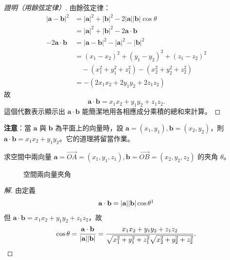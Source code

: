 \begin{proof}[證明（用餘弦定律）]
由餘弦定律：
\begin{align*}
|\mathbf{a} - \mathbf{b}|^2 &= |\mathbf{a}|^2 + |\mathbf{b}|^2 - 2|\mathbf{a}||\mathbf{b}|\cos\theta \\
&= |\mathbf{a}|^2 + |\mathbf{b}|^2 - 2\mathbf{a}\cdot\mathbf{b} \\
-2\mathbf{a}\cdot\mathbf{b} &= |\mathbf{a} - \mathbf{b}|^2 - |\mathbf{a}|^2 - |\mathbf{b}|^2 \\
&= (x_1 - x_2)^2 + (y_1 - y_2)^2 + (z_1 - z_2)^2 \\
&\quad - (x_1^2 + y_1^2 + z_1^2) - (x_2^2 + y_2^2 + z_2^2) \\
&= -(2x_1 x_2 + 2y_1 y_2 + 2z_1 z_2)
\end{align*}
故
\[ \mathbf{a}\cdot\mathbf{b} = x_1 x_2 + y_1 y_2 + z_1 z_2. \]
這個代數表示顯示出 $\mathbf{a}\cdot\mathbf{b}$ 能簡潔地用各相應成分乘積的總和來計算。\qedhere
\end{proof}

\textbf{注意}：當 $\mathbf{a}$ 與 $\mathbf{b}$ 為平面上的向量時，設 $\mathbf{a} = (x_1, y_1), \mathbf{b} = (x_2, y_2)$，則 $\mathbf{a}\cdot\mathbf{b} = x_1 x_2 + y_1 y_2$。它的道理將留當作業。

\begin{example}[論例 9]
求空間中兩向量 $\mathbf{a} = \vec{OA} = (x_1, y_1, z_1), \mathbf{b} = \vec{OB} = (x_2, y_2, z_2)$ 的夾角 $\theta$。
\end{example}

\begin{figure}[H]
\centering
{}
\caption{空間兩向量夾角}
\label{fig:b3-fig3-39}
\end{figure}

\begin{proof}[解]
\label{note:b3-ch3-p113-cos-theta-typo}%
由定義
\[ \mathbf{a}\cdot\mathbf{b} = |\mathbf{a}||\mathbf{b}|\cos\theta\footnotemark \]
但 $\mathbf{a}\cdot\mathbf{b} = x_1 x_2 + y_1 y_2 + z_1 z_2$，故
\[ \cos\theta = \frac{\mathbf{a}\cdot\mathbf{b}}{|\mathbf{a}||\mathbf{b}|} = \frac{x_1 x_2 + y_1 y_2 + z_1 z_2}{\sqrt{x_1^2 + y_1^2 + z_1^2}\sqrt{x_2^2 + y_2^2 + z_2^2}}. \qedhere \]
\end{proof}

